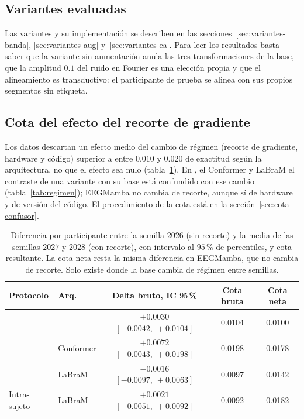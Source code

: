 \subsection{Variantes evaluadas}

Las variantes y su implementación se describen en las secciones~\ref{sec:variantes-banda},
\ref{sec:variantes-aug} y~\ref{sec:variantes-ea}. Para leer los resultados basta saber que la variante
sin aumentación anula las tres transformaciones de la base, que la amplitud $0.1$ del ruido en Fourier es
una elección propia y que el alineamiento es transductivo: el participante de prueba se alinea con sus
propios segmentos sin etiqueta.

\subsection{Cota del efecto del recorte de gradiente}
\label{sec:confusor}

Los datos descartan un efecto medio del cambio de régimen (recorte de gradiente, hardware y código)
superior a entre $0.010$ y $0.020$ de exactitud según la arquitectura, no que el efecto sea nulo
(tabla~\ref{tab:confusor}). En \eegnet{}, el Conformer y LaBraM el contraste de una variante con su base
está confundido con ese cambio (tabla~\ref{tab:regimen}); EEGMamba no cambia de recorte, aunque sí de
hardware y de versión del código. El procedimiento de la cota está en la
sección~\ref{sec:cota-confusor}.

\begin{table}[H]
\centering
\caption{Diferencia por participante entre la semilla $2026$ (sin recorte) y la media de las
semillas $2027$ y $2028$ (con recorte), con intervalo al $95$\,\% de percentiles, y cota resultante.
La cota neta resta la misma diferencia en EEGMamba, que no cambia de recorte. Solo existe donde la base cambia
de régimen entre semillas.}
\label{tab:confusor}
\small
\begin{tabular}{llccc}
\toprule
\textbf{Protocolo} & \textbf{Arq.} & Delta bruto, IC $95$\,\% & Cota bruta & Cota neta \\
\midrule
\loso{} & \eegnet{} & $+0.0030$ $[-0.0042,\ +0.0104]$ & 0.0104 & 0.0100 \\
\loso{} & Conformer & $+0.0072$ $[-0.0043,\ +0.0198]$ & 0.0198 & 0.0178 \\
\loso{} & LaBraM & $-0.0016$ $[-0.0097,\ +0.0063]$ & 0.0097 & 0.0142 \\
Intra-sujeto & LaBraM & $+0.0021$ $[-0.0051,\ +0.0092]$ & 0.0092 & 0.0182 \\
\bottomrule
\end{tabular}
\end{table}

